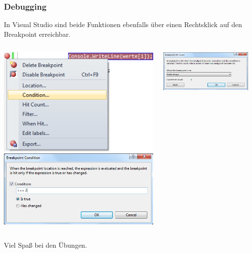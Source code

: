 \documentclass[final]{beamer}
\begin{document}
\begin{frame}
  \frametitle{Debugging}
  In Visual Studio sind beide Funktionen ebenfalls über einen Rechtsklick auf den Breakpoint
  erreichbar.

  \begin{columns}[T]
	\includegraphics[width=\textwidth]{breakpoint_vs}
	\includegraphics[width=\textwidth]{breakpoint_vs_condition}

	\includegraphics[width=\textwidth]{breakpoint_vs_hitcount}
  \end{columns}
\end{frame}

\begin{frame}
  \begin{center}
	\vfill
	\Huge{Viel Spaß bei den Übungen.}
	\vfill
  \end{center}
\end{frame}
\end{document}
